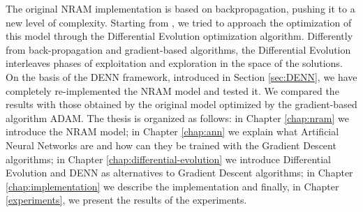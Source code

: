 The original NRAM implementation is based on backpropagation, pushing it to a new level of complexity. Starting from \cite{NRAM:2016}, we tried to approach the optimization of this model through the Differential Evolution optimization algorithm. Differently from back-propagation and gradient-based algorithms, the Differential Evolution interleaves phases of exploitation and exploration in the space of the solutions. On the basis of the DENN framework, introduced in Section \ref{sec:DENN}, we have completely re-implemented the NRAM model and tested it. We compared the results with those obtained by the original model optimized by the gradient-based algorithm ADAM.\newline\newline
The thesis is organized as follows: in Chapter \ref{chap:nram} we introduce the NRAM model; in Chapter \ref{chap:ann} we explain what Artificial Neural Networks are and how can they be trained with the Gradient Descent algorithms; in Chapter \ref{chap:differential-evolution} we introduce Differential Evolution and DENN as alternatives to Gradient Descent algorithms; in Chapter \ref{chap:implementation} we describe the implementation and finally, in Chapter \ref{experiments}, we present the results of the experiments.